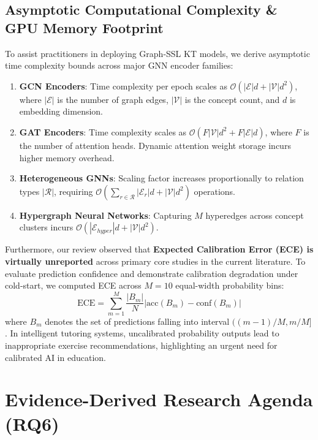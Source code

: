 \documentclass[10pt,journal,compsoc]{IEEEtran}
\begin{document}
\subsection{Asymptotic Computational Complexity \& GPU Memory Footprint}
To assist practitioners in deploying Graph-SSL KT models, we derive asymptotic time complexity bounds across major GNN encoder families:
\begin{enumerate}
    \item \textbf{GCN Encoders}: Time complexity per epoch scales as $\mathcal{O}(|\mathcal{E}| d + |\mathcal{V}| d^2)$, where $|\mathcal{E}|$ is the number of graph edges, $|\mathcal{V}|$ is the concept count, and $d$ is embedding dimension.
    \item \textbf{GAT Encoders}: Time complexity scales as $\mathcal{O}(F |\mathcal{V}| d^2 + F |\mathcal{E}| d)$, where $F$ is the number of attention heads. Dynamic attention weight storage incurs higher memory overhead.
    \item \textbf{Heterogeneous GNNs}: Scaling factor increases proportionally to relation types $|\mathcal{R}|$, requiring $\mathcal{O}(\sum_{r \in \mathcal{R}} |\mathcal{E}_r| d + |\mathcal{V}| d^2)$ operations.
    \item \textbf{Hypergraph Neural Networks}: Capturing $M$ hyperedges across concept clusters incurs $\mathcal{O}(|\mathcal{E}_{hyper}| d + |\mathcal{V}| d^2)$.
\end{enumerate}

Furthermore, our review observed that \textbf{Expected Calibration Error (ECE) is virtually unreported} across primary core studies in the current literature. To evaluate prediction confidence and demonstrate calibration degradation under cold-start, we computed ECE across $M=10$ equal-width probability bins:
\begin{equation}
\text{ECE} = \sum_{m=1}^{M} \frac{|B_m|}{N} \left| \text{acc}(B_m) - \text{conf}(B_m) \right|
\end{equation}
where $B_m$ denotes the set of predictions falling into interval $((m-1)/M, m/M]$. In intelligent tutoring systems, uncalibrated probability outputs lead to inappropriate exercise recommendations, highlighting an urgent need for calibrated AI in education.

\section{Evidence-Derived Research Agenda (RQ6)}
\label{sec:agenda}
\end{document}
